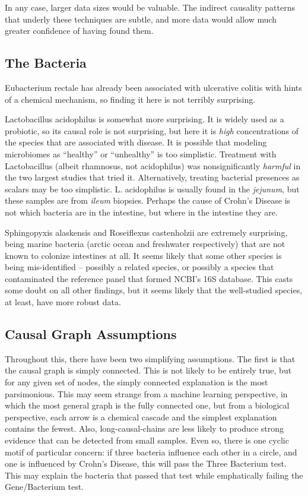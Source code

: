 \documentclass[a4paper]{article}
\begin{document}
In any case, larger data sizes would be valuable.  The indirect
causality patterns that underly these techniques are subtle, and more
data would allow much greater confidence of having found them.

\subsection{The Bacteria}

Eubacterium rectale has
already been associated with ulcerative colitis with hints of a
chemical mechanism\cite{erect}, so finding it here is not terribly
surprising.  

Lactobacillus acidophilus is somewhat more surprising.  It is widely
used as a probiotic, so its causal role is not surprising, but here it
is \textit{high} concentrations of the species that are associated
with disease.  It is possible that modeling microbiomes as ``healthy''
or ``unhealthy'' is too simplistic.  Treatment with Lactobacillus
(albeit rhamnosus, not acidophilus) was nonsignificantly
\textit{harmful} in the two largest studies that tried
it\cite{lgg1,lgg2}.  Alternatively, treating bacterial presences as
scalars may be too simplistic.  L. acidophilus is usually found in the
\textit{jejunum}\cite{lacid}, but these samples are from
\textit{ileum} biopsies.  Perhaps the cause of Crohn's Disease is not
which bacteria are in the intestine, but where in the intestine they
are.

Sphingopyxis alaskensis and Roseiflexus castenholzii are extremely surprising, being marine
bacteria (arctic ocean and freshwater respectively) that are not known to colonize intestines at all.  It seems
likely that some other species is being mis-identified -- possibly a
related species, or possibly a species that contaminated the reference
panel that formed NCBI's 16S database.  This casts some doubt on all
other findings, but it seems likely that the well-studied species, at
least, have more robust data.

\subsection{Causal Graph Assumptions}

Throughout this, there have been two simplifying assumptions.  The first
is that the causal graph is simply connected.  This is not likely to
be entirely true, but for any given set of nodes, the simply connected
explanation is the most parsimonious.  This may seem strange from a
machine learning perspective, in which the most general graph is the
fully connected one, but from a biological perspective, each arrow is
a chemical cascade and the simplest explanation contains the fewest.
Also, long-causal-chains are less likely to produce strong evidence
that can be detected from small samples.  Even so, there is one cyclic
motif of particular concern: if three bacteria influence each other in
a circle, and one is influenced by Crohn's Disease, this will pass the
Three Bacterium test.  This may explain the bacteria that passed that
test while emphatically failing the Gene/Bacterium test.
\end{document}
